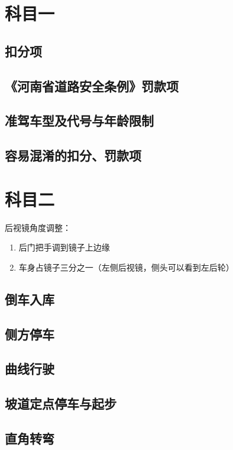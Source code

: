 \documentclass[b5paper]{ctexbook}
\title{\docname}
\author{\companyname}
\date{\today}
\begin{document}
    \maketitle

    \tableofcontents
    \fangsong
    \chapter{科目一}
    \section{扣分项}
    

    \section{《河南省道路安全条例》罚款项}
    

    \section{准驾车型及代号与年龄限制}
    

    \section{容易混淆的扣分、罚款项}
    

    \chapter{科目二}

\noindent
后视镜角度调整：

\begin{enumerate}
    \item 后门把手调到镜子上边缘
    \item 车身占镜子三分之一（左侧后视镜，侧头可以看到左后轮）
\end{enumerate}

    \section{倒车入库}

    

    \section{侧方停车}
    

    \section{曲线行驶}
    

    \section{坡道定点停车与起步}
    

    \section{直角转弯}
    
\end{document}
